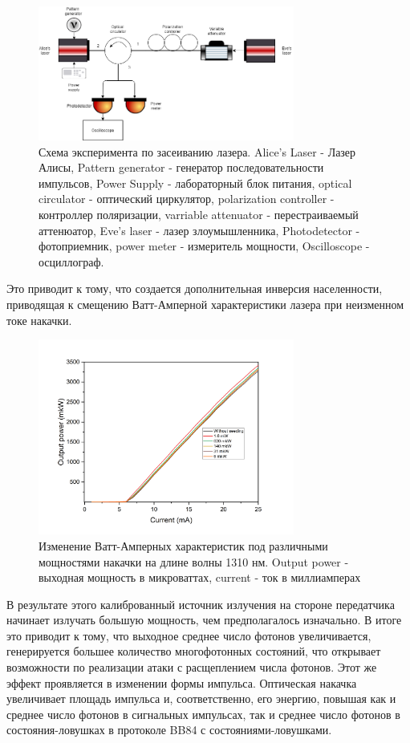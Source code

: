 \begin{figure}
    \centering
    \includegraphics[width=0.75\textwidth]{images/1310 experiment.png}
    \caption{Схема эксперимента по засеиванию лазера. Alice's Laser -  Лазер Алисы, Pattern generator - генератор последовательности импульсов, Power Supply - лабораторный блок питания, optical circulator - оптический циркулятор, polarization controller - контроллер поляризации, varriable attenuator - перестраиваемый аттенюатор, Eve's laser - лазер злоумышленника, Photodetector - фотоприемник, power meter - измеритель мощности, Oscilloscope - осциллограф.}
    \label{fig:exper 1310 ref}
\end{figure}
Это приводит к тому, что создается дополнительная инверсия населенности, приводящая к смещению Ватт-Амперной характеристики лазера при неизменном токе накачки.
\begin{figure}
    \centering
    \includegraphics[width=0.75\textwidth]{images/ватт ампер для диссера.png}
    \caption{Изменение Ватт-Амперных характеристик под различными мощностями накачки на длине волны 1310 нм. Output power - выходная мощность в микроваттах, current - ток в миллиамперах}
    \label{fig:watt-amp ref}
\end{figure}
В результате этого калиброванный источник излучения на стороне передатчика начинает излучать большую мощность, чем предполагалось изначально. В итоге это приводит к тому, что выходное среднее число фотонов увеличивается, генерируется большее количество многофотонных состояний, что открывает возможности по реализации атаки с расщеплением числа фотонов. Этот же эффект проявляется в изменении формы импульса. Оптическая накачка увеличивает площадь импульса и, соответственно, его энергию, повышая как и среднее число фотонов в сигнальных импульсах, так и среднее число фотонов в состояния-ловушках в протоколе BB84 с состояниями-ловушками.
